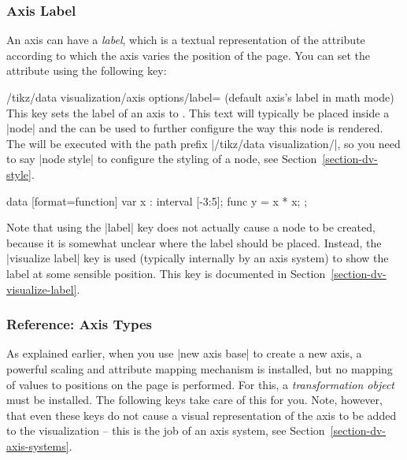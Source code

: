 \subsubsection{Axis Label}

An axis can have a \emph{label}, which is a textual representation of the
attribute according to which the axis varies the position of the page. You can
set the attribute using the following key:

\begin{key}{/tikz/data visualization/axis options/label=
        (default \normalfont axis's label in math mode)%
}
    This key sets the label of an axis to . This text will typically
    be placed inside a |node| and the  can be used to further
    configure the way this node is rendered. The  will be
    executed with the path prefix |/tikz/data visualization/|, so you need to
    say |node style| to configure the styling of a node, see
    Section~\ref{section-dv-style}.
\begin{codeexample}[preamble={\usetikzlibrary{datavisualization.formats.functions}}]
\tikz \datavisualization [
    scientific axes,
    x axis = {label, length=2.5cm},
    y axis = {label={[node style={fill=blue!20}]{$x^2$}}},
    visualize as smooth line]
 data [format=function] {
   var x : interval [-3:5];
   func y = \value x * \value x;
 };
\end{codeexample}
\end{key}

Note that using the |label| key does not actually cause a node to be created,
because it is somewhat unclear where the label should be placed. Instead, the
|visualize label| key is used (typically internally by an axis system) to show
the label at some sensible position. This key is documented in
Section~\ref{section-dv-visualize-label}.


\subsubsection{Reference: Axis Types}
\label{section-dv-reference-axis-types}

As explained earlier, when you use |new axis base| to create a new axis, a
powerful scaling and attribute mapping mechanism is installed, but no mapping
of values to positions on the page is performed. For this, a
\emph{transformation object} must be installed. The following keys take care of
this for you. Note, however, that even these keys do not cause a visual
representation of the axis to be added to the visualization -- this is the job
of an axis system, see Section~\ref{section-dv-axis-systems}.

